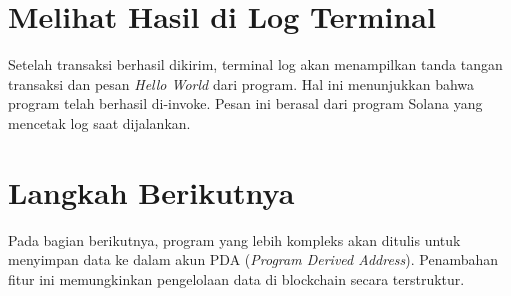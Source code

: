 \section{Melihat Hasil di Log Terminal}
Setelah transaksi berhasil dikirim, terminal log akan menampilkan tanda tangan transaksi dan pesan \textit{Hello World} dari program. Hal ini menunjukkan bahwa program telah berhasil di-invoke. Pesan ini berasal dari program Solana yang mencetak log saat dijalankan.

\section{Langkah Berikutnya}
Pada bagian berikutnya, program yang lebih kompleks akan ditulis untuk menyimpan data ke dalam akun PDA (\textit{Program Derived Address}). Penambahan fitur ini memungkinkan pengelolaan data di blockchain secara terstruktur.
